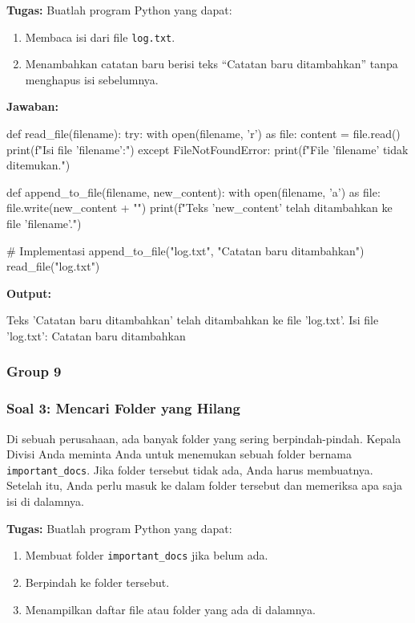 \documentclass[12pt]{article}
\begin{document}
\textbf{Tugas:} Buatlah program Python yang dapat:
\begin{enumerate}
    \item Membaca isi dari file \texttt{log.txt}.
    \item Menambahkan catatan baru berisi teks ``Catatan baru ditambahkan'' tanpa menghapus isi sebelumnya.
\end{enumerate}

\textbf{Jawaban:}
\begin{python}
def read_file(filename):
    try:
        with open(filename, 'r') as file:
            content = file.read()
            print(f"Isi file '{filename}':")
    except FileNotFoundError:
        print(f"File '{filename}' tidak ditemukan.")

def append_to_file(filename, new_content):
    with open(filename, 'a') as file:
        file.write(new_content + "\n")
    print(f"Teks '{new_content}' telah ditambahkan ke file '{filename}'.")

# Implementasi
append_to_file("log.txt", "Catatan baru ditambahkan")
read_file("log.txt")
\end{python}

\textbf{Output:}
\begin{python}
Teks 'Catatan baru ditambahkan' telah ditambahkan ke file 'log.txt'.
Isi file 'log.txt':
Catatan baru ditambahkan
\end{python}

\subsubsection{Group 9}
\subsubsection*{Soal 3: Mencari Folder yang Hilang}
Di sebuah perusahaan, ada banyak folder yang sering berpindah-pindah. Kepala Divisi Anda meminta Anda untuk menemukan sebuah folder bernama \texttt{important\_docs}. Jika folder tersebut tidak ada, Anda harus membuatnya. Setelah itu, Anda perlu masuk ke dalam folder tersebut dan memeriksa apa saja isi di dalamnya.

\textbf{Tugas:} Buatlah program Python yang dapat:
\begin{enumerate}
    \item Membuat folder \texttt{important\_docs} jika belum ada.
    \item Berpindah ke folder tersebut.
    \item Menampilkan daftar file atau folder yang ada di dalamnya.
\end{enumerate}
\end{document}
